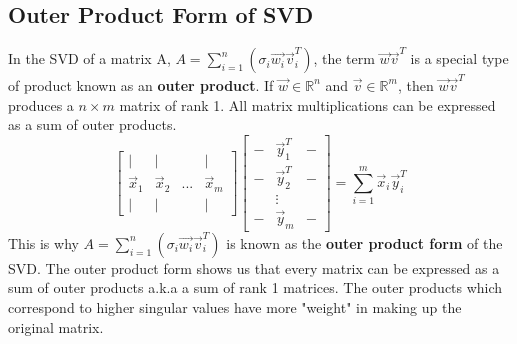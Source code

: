 \documentclass{article}
\begin{document}
\subsection{Outer Product Form of SVD}
In the SVD of a matrix A, $A = \sum_{i=1}^{n}{(\sigma_i\vec{w_i}\vec{v}^T_i)}$, the term $\vec{w}\vec{v}^T$ is a special type of product known as an \textbf{outer product}.
If $\vec{w}\in \mathbb{R}^n$ and $\vec{v}\in \mathbb{R}^m$, then $\vec{w}\vec{v}^T$ produces a $n \times m$ matrix of rank 1.
All matrix multiplications can be expressed as a sum of outer products.
\[
    \left[
        \begin{array}{cccc}
            | & | & & |\\
            \vec{x}_1 & \vec{x}_2 & ... & \vec{x}_m\\
            | & | & & |
        \end{array}
    \right]\left[
        \begin{array}{ccc}
            - & \vec{y}_1^T & -\\
            - & \vec{y}_2^T & -\\
             & \vdots & \\
             - & \vec{y}_m & -
        \end{array}
    \right] = \sum_{i=1}^{m}{\vec{x}_i\vec{y}_i^T}
\]
This is why $A = \sum_{i=1}^{n}{(\sigma_i\vec{w_i}\vec{v}^T_i)}$ is known as the \textbf{outer product form} of the SVD.
The outer product form shows us that every matrix can be expressed as a sum of outer products a.k.a a sum of rank 1 matrices.
The outer products which correspond to higher singular values have more "weight" in making up the original matrix. 
\end{document}
